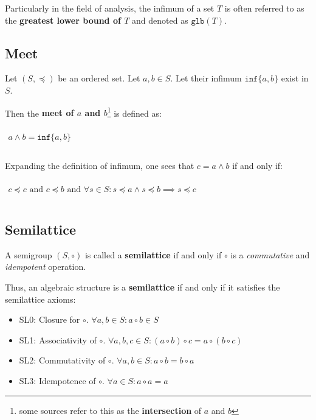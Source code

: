 Particularly in the field of analysis, the infimum of a set $T$ is
often referred to as the \textbf{greatest lower bound of $T$} and
denoted as $\mathtt{glb}(T)$.


\subsection{Meet}
\label{sec:meet}

Let $(S, \preceq)$ be an ordered set. Let $a, b \in S$. Let their
infimum $\mathtt{inf} \{a, b\}$ exist in $S$.

Then the \textbf{meet of $a$ and $b$}\footnote{some sources refer to
  this as the \textbf{intersection} of $a$ and $b$} is defined as:

\begin{math}
  \begin{array}{c}
    \\
    a \wedge b =\mathtt{inf} \{ a, b \}\\
    \\
  \end{array}
\end{math}


Expanding the definition of infimum, one sees that $c = a \wedge b$ if
and only if:

\begin{math}
  \begin{array}{c}
    \\
    c \preceq c\text{ and }c \preceq b\text{ and } \forall s \in S: s \preceq a \land s \preceq b \implies s \preceq c\\
    \\
  \end{array}
\end{math}


\subsection{Semilattice}
\label{sec:semilattice}

A semigroup $(S, \circ)$ is called a \textbf{semilattice} if and only
if $\circ$ is a \textit{commutative} and \textit{idempotent}
operation.

Thus, an algebraic structure is a \textbf{semilattice} if and only if
it satisfies the semilattice axioms:

\begin{itemize}
\item SL0: Closure for $\circ$. $\forall a, b \in S: a \circ b \in S$
\item SL1: Associativity of $\circ$.
  $\forall a, b, c \in S: (a \circ b) \circ c = a \circ (b \circ c)$
\item SL2: Commutativity of $\circ$.
  $\forall a, b \in S: a \circ b = b \circ a$
\item SL3: Idempotence of $\circ$. $\forall a \in S: a \circ a = a$
\end{itemize}


